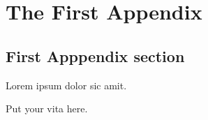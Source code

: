 \documentclass[noendorse]{ukydissertation}
\begin{document}
\backmatter

\chapter{The First Appendix}
\label{cha:first-appendix}

\section{First Apppendix section}
\label{sec:first-appp-sect}
Lorem ipsum dolor sic amit.

\clearpage
 
 

\vita
Put your vita here.
\end{document}
